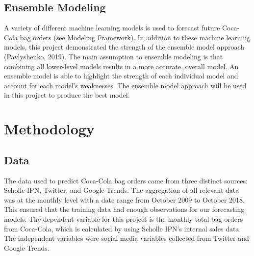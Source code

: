 \documentclass[12pt,oneside]{chicagocapstone}
\begin{document}
\hypertarget{ensemble-modeling}{%
\section*{Ensemble Modeling}\label{ensemble-modeling}}

A variety of different machine learning models is used to forecast future Coca-Cola bag orders (see Modeling Framework). In addition to these machine learning models, this project demonstrated the strength of the ensemble model approach (Pavlyshenko, 2019). The main assumption to ensemble modeling is that combining all lower-level models results in a more accurate, overall model. An ensemble model is able to highlight the strength of each individual model and account for each model's weaknesses. The ensemble model approach will be used in this project to produce the best model.

\newpage

\hypertarget{methodology}{%
\chapter*{Methodology}\label{methodology}}

\hypertarget{data}{%
\section*{Data}\label{data}}

The data used to predict Coca-Cola bag orders came from three distinct sources: Scholle IPN, Twitter, and Google Trends. The aggregation of all relevant data was at the monthly level with a date range from October 2009 to October 2018. This ensured that the training data had enough observations for our forecasting models. The dependent variable for this project is the monthly total bag orders from Coca-Cola, which is calculated by using Scholle IPN's internal sales data. The independent variables were social media variables collected from Twitter and Google Trends.
\end{document}
